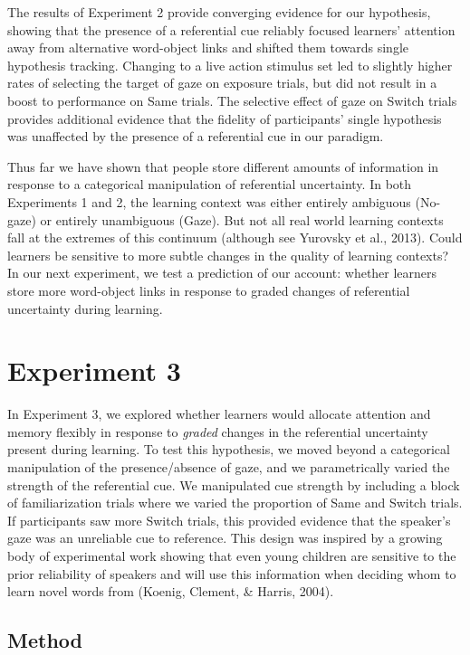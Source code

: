 \documentclass[authoryear, review]{elsarticle}
\begin{document}
The results of Experiment 2 provide converging evidence for our
hypothesis, showing that the presence of a referential cue reliably
focused learners' attention away from alternative word-object links and
shifted them towards single hypothesis tracking. Changing to a live
action stimulus set led to slightly higher rates of selecting the target
of gaze on exposure trials, but did not result in a boost to performance
on Same trials. The selective effect of gaze on Switch trials provides
additional evidence that the fidelity of participants' single hypothesis
was unaffected by the presence of a referential cue in our paradigm.

Thus far we have shown that people store different amounts of
information in response to a categorical manipulation of referential
uncertainty. In both Experiments 1 and 2, the learning context was
either entirely ambiguous (No-gaze) or entirely unambiguous (Gaze). But
not all real world learning contexts fall at the extremes of this
continuum (although see Yurovsky et al., 2013). Could learners be
sensitive to more subtle changes in the quality of learning contexts? In
our next experiment, we test a prediction of our account: whether
learners store more word-object links in response to graded changes of
referential uncertainty during learning.

\section{Experiment 3}\label{experiment-3}

In Experiment 3, we explored whether learners would allocate attention
and memory flexibly in response to \emph{graded} changes in the
referential uncertainty present during learning. To test this
hypothesis, we moved beyond a categorical manipulation of the
presence/absence of gaze, and we parametrically varied the strength of
the referential cue. We manipulated cue strength by including a block of
familiarization trials where we varied the proportion of Same and Switch
trials. If participants saw more Switch trials, this provided evidence
that the speaker's gaze was an unreliable cue to reference. This design
was inspired by a growing body of experimental work showing that even
young children are sensitive to the prior reliability of speakers and
will use this information when deciding whom to learn novel words from
(Koenig, Clement, \& Harris, 2004).

\subsection{Method}\label{method-2}
\end{document}
